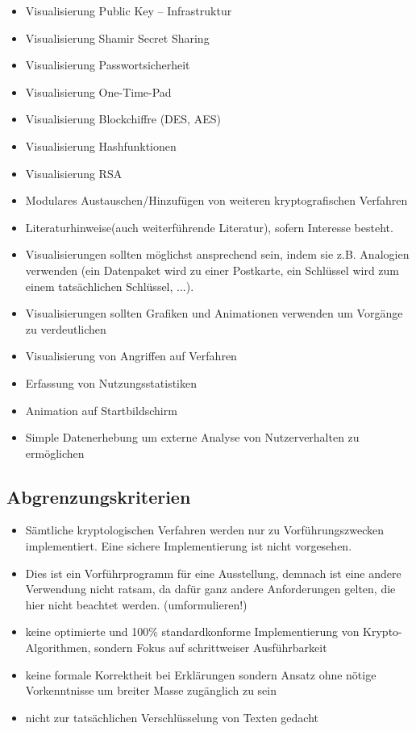 \documentclass{article}
\begin{document}
\begin{itemize}
    \item Visualisierung Public Key – Infrastruktur
    \item Visualisierung Shamir Secret Sharing
    \item Visualisierung Passwortsicherheit
    \item Visualisierung One-Time-Pad
    \item Visualisierung Blockchiffre (DES, AES)
    \item Visualisierung Hashfunktionen
    \item Visualisierung RSA
    \item Modulares Austauschen/Hinzufügen von weiteren kryptografischen Verfahren
    \item Literaturhinweise(auch weiterführende Literatur), sofern Interesse besteht.
    \item Visualisierungen sollten möglichst ansprechend sein, indem sie z.B. Analogien 
        verwenden (ein Datenpaket wird zu einer Postkarte, ein Schlüssel wird zum einem tatsächlichen Schlüssel, ...).
    \item Visualisierungen sollten Grafiken und Animationen verwenden um Vorgänge zu verdeutlichen
    \item Visualisierung von Angriffen auf Verfahren
    \item Erfassung von Nutzungsstatistiken
    \item Animation auf Startbildschirm
    \item Simple Datenerhebung um externe Analyse von Nutzerverhalten zu ermöglichen
\end{itemize}

\subsection{Abgrenzungskriterien}
\begin{itemize}
    \item Sämtliche kryptologischen Verfahren werden nur zu Vorführungszwecken implementiert. Eine sichere Implementierung ist nicht vorgesehen.
    \item Dies ist ein Vorführprogramm für eine Ausstellung, demnach ist eine andere  Verwendung nicht ratsam, 
        da dafür ganz andere Anforderungen gelten, die hier nicht beachtet werden. (umformulieren!)
    \item keine optimierte und 100\% standardkonforme Implementierung von Krypto-Algorithmen, 
        sondern Fokus auf schrittweiser Ausführbarkeit
    \item keine formale Korrektheit bei Erklärungen sondern Ansatz ohne nötige Vorkenntnisse 
        um breiter Masse zugänglich zu sein
    \item nicht zur tatsächlichen Verschlüsselung von Texten gedacht 
\end{itemize}
\end{document}
